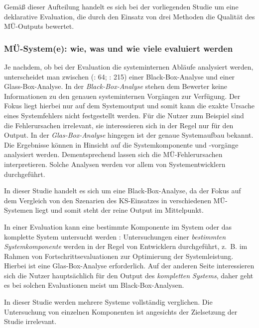 Gemäß dieser Aufteilung handelt es sich bei der vorliegenden Studie um eine deklarative Evaluation, die durch den Einsatz von drei Methoden die Qualität des MÜ-Outputs bewertet.

\subsubsection{MÜ-System(e): wie, was und wie viele evaluiert werden}



Je nachdem, ob bei der Evaluation die systeminternen Abläufe analysiert werden, unterscheidet man zwischen (\citealt{Weber1998}: 64; \citealt{White2003}: 215) einer Black-Box-Analyse und einer Glass-Box-Analyse. In der \textit{Black-Box-Analyse} stehen dem Bewerter keine Informationen zu den genauen systeminternen Vorgängen zur Verfügung. Der Fokus liegt hierbei nur auf dem Systemoutput und somit kann die exakte Ursache eines Systemfehlers nicht festgestellt werden. Für die Nutzer zum Beispiel sind die Fehlerursachen irrelevant, sie interessieren sich in der Regel nur für den Output. In der \textit{Glas-Box-Analyse} hingegen ist der genaue Systemaufbau bekannt. Die Ergebnisse können in Hinsicht auf die Systemkomponente und -vorgänge analysiert werden. Dementsprechend lassen sich die MÜ-Fehlerursachen interpretieren. Solche Analysen werden vor allem von Systementwicklern durchgeführt.

In dieser Studie handelt es sich um eine Black-Box-Analyse, da der Fokus auf dem Vergleich von den Szenarien des KS-Einsatzes in verschiedenen MÜ-Systemen liegt und somit steht der reine Output im Mittelpunkt.


In einer Evaluation kann eine bestimmte Komponente im System oder das komplette System untersucht werden \citep[65]{Weber1998}: Untersuchungen einer \textit{bestimmten Systemkomponente} werden in der Regel von Entwicklern durchgeführt, z.~B. im Rahmen von Fortschrittsevaluationen zur Optimierung der Systemleistung. Hierbei ist eine Glas-Box-Analyse erforderlich. Auf der anderen Seite interessieren sich die Nutzer hauptsächlich für den Output des \textit{kompletten Systems}, daher geht es bei solchen Evaluationen meist um Black-Box-Analysen.

In dieser Studie werden mehrere Systeme vollständig verglichen. Die Untersuchung von einzelnen Komponenten ist angesichts der Zielsetzung der Studie irrelevant.

